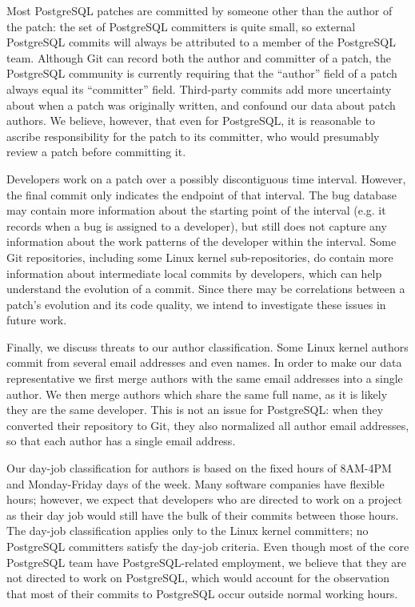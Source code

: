 Most PostgreSQL patches are committed by someone other than the author of the
patch: the set of PostgreSQL committers is quite small, so external PostgreSQL
commits will always be attributed to a member of the PostgreSQL team. Although
Git can record both the author and committer of a patch, the PostgreSQL
community is currently requiring that the ``author'' field of a patch always
equal its ``committer'' field.  Third-party commits add more uncertainty about
when a patch was originally written, and confound our data about patch authors.
We believe, however, that even for PostgreSQL, it is reasonable to ascribe
responsibility for the patch to its committer, who would presumably review a
patch before committing it.

Developers work on a patch over a possibly discontiguous time interval. However,
the final commit only indicates the endpoint of that interval.  The bug database
may contain more information about the starting point of the interval (e.g. it
records when a bug is assigned to a developer), but still does not capture any
information about the work patterns of the developer within the interval. Some
Git repositories, including some Linux kernel sub-repositories, do contain more
information about intermediate local commits by developers, which can help
understand the evolution of a commit. Since there may be correlations between a
patch's evolution and its code quality, we intend to investigate these issues in
future work.

Finally, we discuss threats to our author classification. Some Linux kernel
authors commit from several email addresses and even names. In order to make our
data representative we first merge authors with the same email addresses into a
single author. We then merge authors which share the same full name, as it is
likely they are the same developer. This is not an issue for PostgreSQL: when
they converted their repository to Git, they also normalized all author email
addresses, so that each author has a single email address.

Our day-job classification for authors is based on the fixed hours of 8AM-4PM
and Monday-Friday days of the week. Many software companies have flexible hours;
however, we expect that developers who are directed to work on a project as
their day job would still have the bulk of their commits between those
hours. The day-job classification applies only to the Linux kernel committers;
no PostgreSQL committers satisfy the day-job criteria. Even though most of the
core PostgreSQL team have PostgreSQL-related employment, we believe that they
are not directed to work on PostgreSQL, which would account for the observation
that most of their commits to PostgreSQL occur outside normal working hours.

